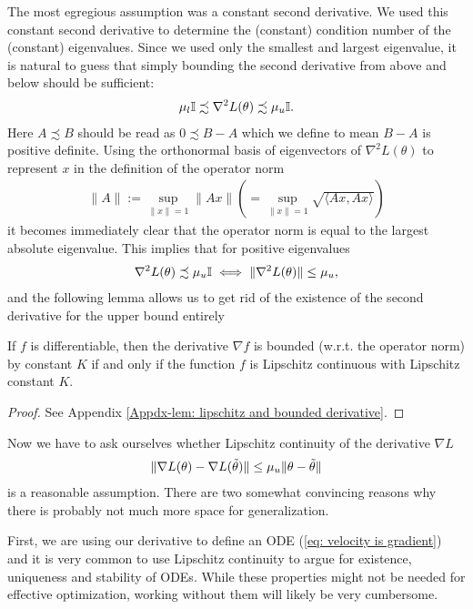 The most egregious assumption was a constant second derivative. We used this
constant second derivative to determine the (constant) condition number of
the (constant) eigenvalues. Since we used only the smallest and largest
eigenvalue, it is natural to guess that simply bounding the second derivative
from above and below should be sufficient:
%
\begin{align*}
	\mu_l \mathbb{I} \precsim \nabla^2 L(\theta) \precsim \mu_u \mathbb{I}.
\end{align*}
%
Here \(A \precsim B\) should be read as \(0\precsim B-A\) which we define to mean
\(B-A\) is positive definite. Using the orthonormal basis of eigenvectors of
\(\nabla^2 L(\theta)\) to represent \(x\) in the definition of the operator norm
%
\begin{align*}
	\|A\| := \sup_{\|x\| =1} \|Ax\|
	\left(= \sup_{\|x\| =1} \sqrt{\langle Ax, Ax\rangle}\right)
\end{align*}
%
it becomes immediately clear that the operator norm is equal to the largest
absolute eigenvalue. This implies that for positive eigenvalues 
%
\begin{align*}
	\nabla^2 L(\theta) \precsim \mu_u\mathbb{I}
	\iff \|\nabla^2 L(\theta)\|\le \mu_u,
\end{align*}
%
and the following lemma allows us to get rid of the existence of the second
derivative for the upper bound entirely
%
\begin{lemma}\label{lem: lipschitz and bounded derivative}
	If \(f\) is differentiable, then the derivative \(\nabla f\) is
	bounded (w.r.t. the operator norm) by constant \(K\) if and only if the function
	\(f\) is Lipschitz continuous with Lipschitz constant \(K\).
\end{lemma}
\begin{proof}
	See Appendix \ref{Appdx-lem: lipschitz and bounded derivative}.
\end{proof}
%
\noindent
Now we have to ask ourselves whether Lipschitz continuity of the derivative
\(\nabla L\)
%
\begin{align*}
	\| \nabla L(\theta) - \nabla L(\tilde{\theta})\|
	\le \mu_u \|\theta-\tilde{\theta}\|
\end{align*}
%
is a reasonable assumption. There are two somewhat convincing reasons why there
is probably not much more space for generalization.

First, we are using our derivative to define an ODE (\ref{eq: velocity is
gradient}) and it is very common to use Lipschitz continuity to argue for
existence, uniqueness and stability of ODEs. While these properties might not
be needed for effective optimization, working without them will likely be very
cumbersome.

